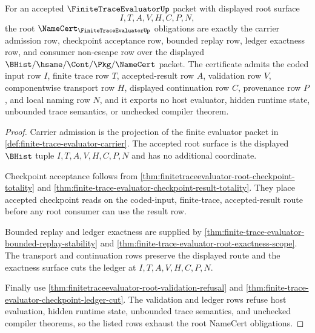 \begin{theorem}
\label{thm:finitetrace-evaluator-root-namecert-obligations}
For an accepted $\FiniteTraceEvaluatorUp$ packet with displayed root surface
$$
I,T,A,V,H,C,P,N,
$$
the root $\NameCert_{\FiniteTraceEvaluatorUp}$ obligations are exactly the
carrier admission row, checkpoint acceptance row, bounded replay row, ledger
exactness row, and consumer non-escape row over the displayed
$\BHist/\hsame/\Cont/\Pkg/\NameCert$ packet. The certificate admits the coded
input row $I$, finite trace row $T$, accepted-result row $A$, validation row
$V$, componentwise transport row $H$, displayed continuation row $C$,
provenance row $P$, and local naming row $N$, and it exports no host evaluator,
hidden runtime state, unbounded trace semantics, or unchecked compiler theorem.
\end{theorem}
\begin{proof}
Carrier admission is the projection of the finite evaluator packet in
\autoref{def:finite-trace-evaluator-carrier}. The accepted root surface is the
displayed $\BHist$ tuple $I,T,A,V,H,C,P,N$ and has no additional coordinate.

Checkpoint acceptance follows from
\autoref{thm:finitetraceevaluator-root-checkpoint-totality} and
\autoref{thm:finite-trace-evaluator-checkpoint-result-totality}. They place
accepted checkpoint reads on the coded-input, finite-trace, accepted-result
route before any root consumer can use the result row.

Bounded replay and ledger exactness are supplied by
\autoref{thm:finite-trace-evaluator-bounded-replay-stability} and
\autoref{thm:finite-trace-evaluator-root-exactness-scope}. The transport and
continuation rows preserve the displayed route and the exactness surface cuts
the ledger at $I,T,A,V,H,C,P,N$.

Finally use \autoref{thm:finitetraceevaluator-root-validation-refusal} and
\autoref{thm:finite-trace-evaluator-checkpoint-ledger-cut}. The validation and
ledger rows refuse host evaluation, hidden runtime state, unbounded trace
semantics, and unchecked compiler theorems, so the listed rows exhaust the
root NameCert obligations.
\end{proof}

